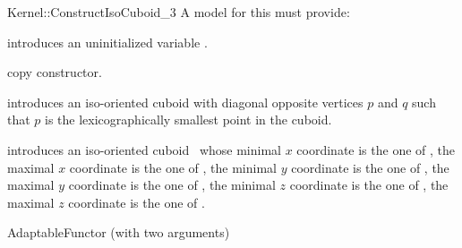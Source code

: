 \begin{ccRefFunctionObjectConcept}{Kernel::ConstructIsoCuboid_3}
A model for this must provide:



\ccHidden {}
             {introduces an uninitialized variable .}

\ccHidden {}
            {copy constructor.}

            {introduces an iso-oriented cuboid  with diagonal
             opposite vertices $p$ and $q$ such that $p$ is the
             lexicographically smallest point in the cuboid.}

            {introduces an iso-oriented cuboid \ccVar\ whose
             minimal $x$ coordinate is the one of , the
             maximal $x$ coordinate is the one of , the
             minimal $y$ coordinate is the one of , the
             maximal $y$ coordinate is the one of , the
             minimal $z$ coordinate is the one of , the
             maximal $z$ coordinate is the one of .}

\ccRefines
AdaptableFunctor (with two arguments)

\ccSeeAlso
{}  \\

\end{ccRefFunctionObjectConcept}
